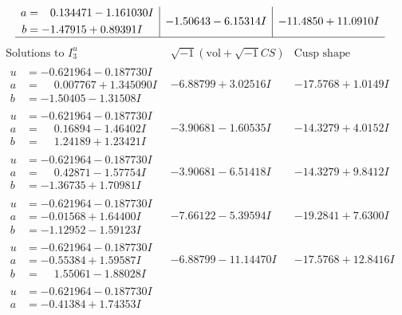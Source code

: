\documentclass[1p]{elsarticle_modified}
\theoremstyle{definition}
\newcommand{\I}{\sqrt{-1}}
\begin{document}
$$\begin{array}{c|c|c}
\begin{aligned}
a &= \phantom{-}0.134471 - 1.161030 I \\
b &= -1.47915 + 0.89391 I\end{aligned}
 & -1.50643 - 6.15314 I & -11.4850 + 11.0910 I\\
 \hline 
 \end{array}$$\newpage$$\begin{array}{c|c|c}  
\text{Solutions to }I^u_{3}& \I (\text{vol} + \sqrt{-1}CS) & \text{Cusp shape}\\
 \hline 
\begin{aligned}
u &= -0.621964 - 0.187730 I \\
a &= \phantom{-}0.007767 + 1.345090 I \\
b &= -1.50405 - 1.31508 I\end{aligned}
 & -6.88799 + 3.02516 I & -17.5768 + 1.0149 I \\ \hline\begin{aligned}
u &= -0.621964 - 0.187730 I \\
a &= \phantom{-}0.16894 - 1.46402 I \\
b &= \phantom{-}1.24189 + 1.23421 I\end{aligned}
 & -3.90681 - 1.60535 I & -14.3279 + 4.0152 I \\ \hline\begin{aligned}
u &= -0.621964 - 0.187730 I \\
a &= \phantom{-}0.42871 - 1.57754 I \\
b &= -1.36735 + 1.70981 I\end{aligned}
 & -3.90681 - 6.51418 I & -14.3279 + 9.8412 I \\ \hline\begin{aligned}
u &= -0.621964 - 0.187730 I \\
a &= -0.01568 + 1.64400 I \\
b &= -1.12952 - 1.59123 I\end{aligned}
 & -7.66122 - 5.39594 I & -19.2841 + 7.6300 I \\ \hline\begin{aligned}
u &= -0.621964 - 0.187730 I \\
a &= -0.55384 + 1.59587 I \\
b &= \phantom{-}1.55061 - 1.88028 I\end{aligned}
 & -6.88799 - 11.14470 I & -17.5768 + 12.8416 I \\ \hline\begin{aligned}
u &= -0.621964 - 0.187730 I \\
a &= -0.41384 + 1.74353 I \\

\end{aligned}
\end{array}$$
\end{document}
